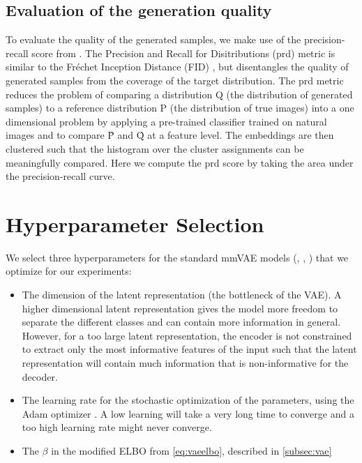 \subsection{Evaluation of the generation quality}
\label{subsubsec:gen_qual}
To evaluate the quality of the generated samples, we make use of the precision-recall score from \cite{precision_recall_distributions}.
The Precision and Recall for Disitributions (prd) metric is similar to the Fréchet Inception Distance (FID) \citep{heusel_gans_2017}, but disentangles the quality of generated samples from the coverage of the target distribution.
The prd metric reduces the problem of comparing a distribution Q (the distribution of generated samples) to a reference distribution P (the distribution of true images) into a one dimensional problem by applying a pre-trained classifier trained on natural images and to compare \^{P} and \^{Q} at a feature level.
The embeddings are then clustered such that the histogram over the cluster assignments can be meaningfully compared.
Here we compute the prd score by taking the area under the precision-recall curve.

\section{Hyperparameter Selection}
We select three hyperparameters for the standard mmVAE models (, , ) that we optimize for our experiments:

\begin{itemize}
    \item The dimension of the latent representation (the bottleneck of the VAE).
    A higher dimensional latent representation gives the model more freedom to separate the different classes and can contain more information in general.
    However, for a too large latent representation, the encoder is not constrained to extract only the most informative features of the input such that the latent representation will contain much information that is non-informative for the decoder.
    \item The learning rate for the stochastic optimization of the parameters, using the Adam optimizer \citep{kingma_adam_2017}.
    A low learning will take a very long time to converge and a too high learning rate might never converge.
    \item The $\beta$ in the modified ELBO from \cref{eq:vaeelbo}, described in \cref{subsec:vae}
\end{itemize}

